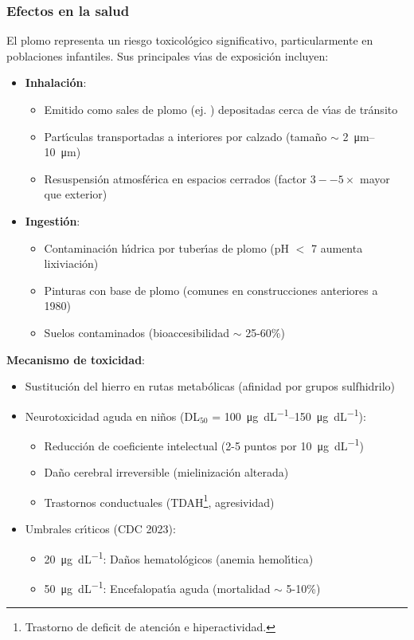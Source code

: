 \subsubsection{Efectos en la salud} El plomo representa un riesgo toxicol\'{o}gico significativo, particularmente en poblaciones infantiles. Sus principales v\'{\i}as de exposici\'{o}n incluyen:

\begin{itemize}
    \item \textbf{Inhalaci\'{o}n}: 
    \begin{itemize}
        \item Emitido como sales de plomo (ej. ) depositadas cerca de v\'{\i}as de tr\'{a}nsito
        \item Part\'{\i}culas transportadas a interiores por calzado (tama\~no $\sim$ \SIrange{2}{10}{\micro\metre})
        \item Resuspensi\'{o}n atmosf\'{e}rica en espacios cerrados (factor $3--5\times$ mayor que exterior)
    \end{itemize}
    
    \item \textbf{Ingesti\'{o}n}:
    \begin{itemize}
        \item Contaminaci\'{o}n h\'{\i}drica por tuber\'{\i}as de plomo (pH $<$ 7 aumenta lixiviaci\'{o}n)
        \item Pinturas con base de plomo (comunes en construcciones anteriores a 1980)
        \item Suelos contaminados (bioaccesibilidad $\sim$ 25-60\%)
    \end{itemize}
\end{itemize}

\textbf{Mecanismo de toxicidad}:
\begin{itemize}
    \item Sustituci\'{o}n del hierro en rutas metab\'{o}licas (afinidad por grupos sulfhidrilo)
    \item Neurotoxicidad aguda en ni\~nos (DL$_{50}$ = \SIrange{100}{150}{\micro\gram\per\deci\liter}):
    \begin{itemize}
        \item Reducci\'{o}n de coeficiente intelectual (2-5 puntos por \SI{10}{\micro\gram\per\deci\liter})
        \item Da\~no cerebral irreversible (mielinizaci\'{o}n alterada)
        \item Trastornos conductuales (TDAH\footnote{Trastorno de deficit de atenci\'on e hiperactividad.}, agresividad)
    \end{itemize}
    
    \item Umbrales cr\'{\i}ticos (CDC 2023):
    \begin{itemize}
        \item \SI{20}{\micro\gram\per\deci\liter}: Da\~nos hematol\'{o}gicos (anemia hemol\'{\i}tica)
        \item \SI{50}{\micro\gram\per\deci\liter}: Encefalopat\'{\i}a aguda (mortalidad $\sim$ 5-10\%)
    \end{itemize}
\end{itemize}

